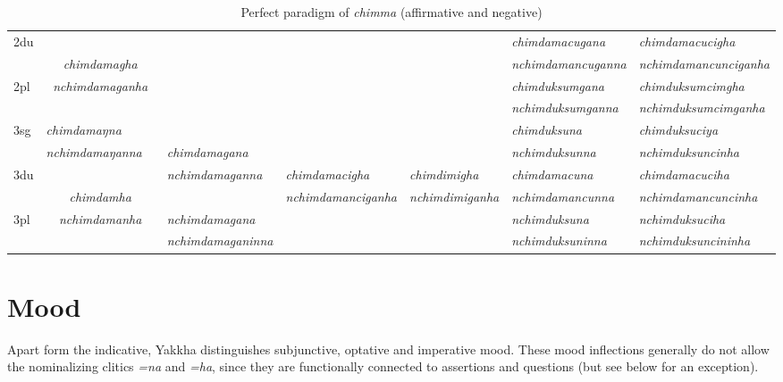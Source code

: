\begin{landscape}
\begin{table}[p]
{{\begin{tabular}{|l||p{2.8cm}|p{1.6cm}|p{2.8cm}|p{3.0cm}|p{2.8cm}|p{3.2cm}|p{3.6cm}|}
 \cline{1-2} \cline{7-8}			
{\sc 2du}		& \multicolumn{2}{c|}{}     & \multicolumn{3}{c|}{\cellcolor[gray]{.8}} & \it  chimdamacugana  & \it   chimdamacucigha \\
		& \multicolumn{2}{c|}{\it chimdamagha} & \multicolumn{3}{c|}{\cellcolor[gray]{.8} }& \it nchimdamancuganna  & \it  nchimdamancunciganha \\
 \cline{1-1} \cline{7-8}			
{\sc 2pl}		& \multicolumn{2}{c|}{\it nchimdamaganha} & \multicolumn{3}{c|}{\cellcolor[gray]{.8} }& \it  chimduksumgana& \it  chimduksumcimgha  \\
		& \multicolumn{2}{c|}{ }& \multicolumn{3}{c|}{ \cellcolor[gray]{.8}}& \it  nchimduksumganna & \it  nchimduksumcimganha \\
\hline			
{\sc 3sg} 		& \it chimdamaŋna	  & \it 	      	& \it   			& \it     & \it     	& \it chimduksuna& \it chimduksuciya\\
		& \it  nchimdamaŋanna   & \it    	& \it  chimdamagana	& \it   & \it    & \it nchimduksunna& \it nchimduksuncinha\\
  \cline{1-2}  \cline{7-8}					
{\sc 3du}&  \multicolumn{2}{c|}{}& \it nchimdamaganna& \it  chimdamacigha& \it chimdimigha& \it   chimdamacuna & \it   chimdamacuciha\\
	& \multicolumn{2}{c|}{\it chimdamha}& \it  & \it nchimdamanciganha& \it  nchimdimiganha & \it  nchimdamancunna & \it  nchimdamancuncinha\\
 \cline{1-1} \cline{4-4} \cline{7-8}	
{\sc 3pl} &  \multicolumn{2}{c|}{\it nchimdamanha}	& \it nchimdamagana& \it  & \it  & \it nchimduksuna& \it nchimduksuciha\\	
	&\multicolumn{2}{c|}{ }& \it nchimdamaganinna& \it & \it  & \it nchimduksuninna& \it nchimduksuncininha \\
\hline
\end{tabular}
}
}
\caption{Perfect paradigm of \emph{chimma}  (affirmative and negative)}\label{par-chimd-prf}
\end{table}

\end{landscape}


\section{Mood}\label{mood}

Apart form the indicative, Yakkha distinguishes subjunctive, optative and  imperative mood. These mood inflections generally do not allow the nominalizing clitics \emph{=na} and \emph{=ha}, since they are functionally connected to assertions and questions (but see below for an exception).

